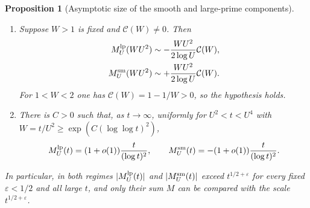 \documentclass[11pt,reqno]{amsart}
\numberwithin{equation}{section}
\theoremstyle{plain}
\newtheorem{proposition}[theorem]{Proposition}
\theoremstyle{definition}
\theoremstyle{remark}
\newcommand{\eps}{\varepsilon}
\newcommand{\Cc}{\mathcal{C}}
\begin{document}
\begin{proposition}[Asymptotic size of the smooth and large-prime components]
\label{prop:both_parts_large}
\begin{enumerate}[label=\textup{(\roman*)},leftmargin=*]
\item Suppose $W>1$ is fixed and $\Cc(W)\ne0$. Then
\begin{align}
\label{eq:E_fixed_W_size}
  M^{\rm lp}_U(WU^2)&\sim-\frac{WU^2}{2\log U}\Cc(W),\\
  M^{\rm sm}_U(WU^2)&\sim+\frac{WU^2}{2\log U}\Cc(W).
\end{align}
For $1<W<2$ one has $\Cc(W)=1-1/W>0$, so the hypothesis holds.
\item There is $C>0$ such that, as $t\to\infty$, uniformly for $U^2<t<U^4$
with $W=t/U^2\ge\exp(C(\log\log t)^2)$,
\begin{equation}
\label{eq:E_log2}
  M^{\rm lp}_U(t)=(1+o(1))\frac{t}{(\log t)^2},\qquad
  M^{\rm sm}_U(t)=-(1+o(1))\frac{t}{(\log t)^2}.
\end{equation}
\end{enumerate}
In particular, in both regimes $|M^{\rm lp}_U(t)|$ and $|M^{\rm sm}_U(t)|$ exceed
$t^{1/2+\eps}$ for every fixed $\eps<1/2$ and all large $t$, and only their
sum $M$ can be compared with the scale $t^{1/2+\eps}$.
\end{proposition}
\end{document}
